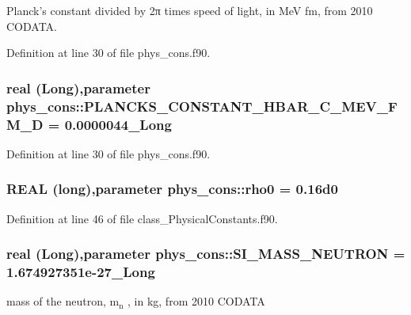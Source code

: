 Planck's constant divided by 2π times speed of light, in MeV fm, from 2010 CODATA. 



Definition at line 30 of file phys\_\-cons.f90.

\hypertarget{namespacephys__cons_a86cb86e86548ce7318d0143b2f4b2f88}{
\subsubsection[{PLANCKS\_\-CONSTANT\_\-HBAR\_\-C\_\-MEV\_\-FM\_\-D}]{\setlength{\rightskip}{0pt plus 5cm}real (Long),parameter {\bf phys\_\-cons::PLANCKS\_\-CONSTANT\_\-HBAR\_\-C\_\-MEV\_\-FM\_\-D} = 0.0000044\_\-Long}}
\label{namespacephys__cons_a86cb86e86548ce7318d0143b2f4b2f88}


Definition at line 30 of file phys\_\-cons.f90.

\hypertarget{namespacephys__cons_a4b10513970a98ad78b85723c60d9a8b6}{
\subsubsection[{rho0}]{\setlength{\rightskip}{0pt plus 5cm}REAL (long),parameter {\bf phys\_\-cons::rho0} = 0.16d0}}
\label{namespacephys__cons_a4b10513970a98ad78b85723c60d9a8b6}


Definition at line 46 of file class\_\-PhysicalConstants.f90.

\hypertarget{namespacephys__cons_ab117ad83bb79e4ed199d17f3c63ec4b3}{
\subsubsection[{SI\_\-MASS\_\-NEUTRON}]{\setlength{\rightskip}{0pt plus 5cm}real (Long),parameter {\bf phys\_\-cons::SI\_\-MASS\_\-NEUTRON} = 1.674927351e-\/27\_\-Long}}
\label{namespacephys__cons_ab117ad83bb79e4ed199d17f3c63ec4b3}


mass of the neutron, m$_{\mbox{n}}$ , in kg, from 2010 CODATA 



